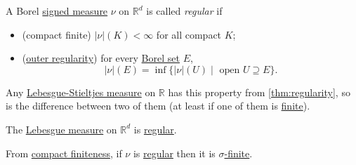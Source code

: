 \begin{definition}[Regular]\label{def:regular}
	A Borel \hyperref[def:signed-measure]{signed measure} \(\nu\) on \(\mathbb{R}^d\) is called \emph{regular} if
	\begin{itemize}
		\item\label{def:regular-compact-finite} (compact finite) \(\left\vert \nu \right\vert(K) < \infty\) for all compact \(K\);
		\item\label{def:regular-outer-regularity} (\hyperref[thm:regularity]{outer regularity}) for every \hyperref[def:Borel-set]{Borel set} \(E\),
		      \[
			      \vert \nu \vert(E) = \inf\{\vert \nu \vert(U) \mid \text{ open } U \supseteq E\}.
		      \]
	\end{itemize}
\end{definition}

\begin{eg}
	Any \hyperref[def:Lebesgue-Stieltjes-measure]{Lebesgue-Stieltjes measure} on \(\mathbb{R}\) has this property from \autoref{thm:regularity}, so is the difference between two of them (at least if one of them is \hyperref[def:finite-signed-measure]{finite}).
\end{eg}

\begin{eg}
	The \hyperref[def:Lebesgue-measure]{Lebesgue measure} on \(\mathbb{R}^d\) is \hyperref[def:regular]{regular}.
\end{eg}

\begin{note}
	From \hyperref[def:regular-compact-finite]{compact finiteness}, if \(\nu\) is \hyperref[def:regular]{regular} then it is \hyperref[def:finite-signed-measure]{\(\sigma\)-finite}.
\end{note}

